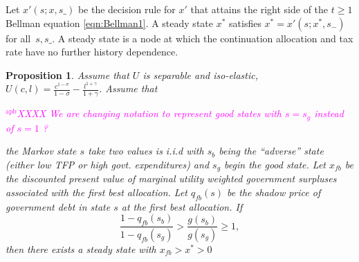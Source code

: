 \documentclass[12pt]{article}
\newcommand{\apb}[1]{\textcolor{magenta}{$^{\textrm{apb}}${#1}}}
\newcommand{\tjs}[1]{\textcolor{red}{$^{\textrm{tjs}}${#1}}}
\newtheorem{proposition}[theorem]{Proposition}
\begin{document}
Let $x'\left( s;{x},s\_\right) $ be the decision rule for $x'$ that attains the right side of the $t\geq1$ Bellman equation
\eqref{eqn:Bellman1}.  A steady state  ${x}^{*} $  satisfies ${ x}^{*}  =x' \left( s;{x}^{*},s_{-}\right) $ for all $%
\,s,s\_$.
A steady state is a node at which the  continuation allocation and tax rate have no further history dependence.

\begin{proposition}\label{prop:existenceU}
Assume that $U$ is  separable and iso-elastic,	 $U(c,l) = \frac{c^{1-\sigma}}{1-\sigma} -\frac{ l^{1+\gamma}}{1+\gamma}$.
Assume that

\apb{XXXX We are changing notation to represent good states with $s=s_g$ instead of $s=1$ ?}

	 the Markov state $s$ take two values is  i.i.d with $s_b$  being the ``adverse'' state (either low TFP or high govt. expenditures)
and $s_g$ begin the good state.
		Let $x_{fb}$ be the discounted present value of marginal utility weighted government surpluses associated with the first best allocation. 
	 Let $q_{fb}(s)$ be the shadow price of government debt in state $s$ at the first best allocation.
	If
	\begin{equation}\label{eqn:prop52sufficient}
		\frac{1-q_{fb}(s_b)}{1-q_{fb}(s_g)} > \frac{g(s_b)}{g(s_g)}\geq 1 ,
	\end{equation}
		then there exists a steady state with $x_{fb}>x^*>0$
		\end{proposition}
\end{document}
